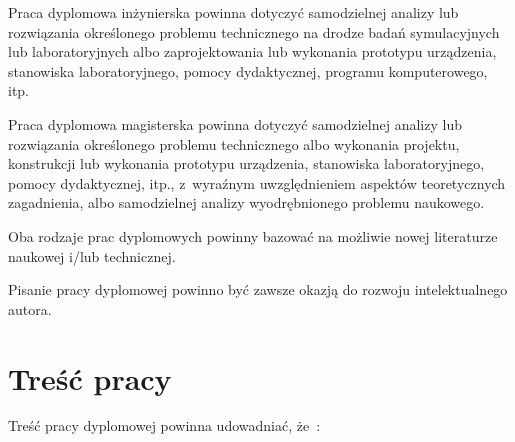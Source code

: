 \documentclass[skorowidz,skroty]{dyplomWEZUT}
\begin{document}
Praca dyplomowa inżynierska powinna dotyczyć samodzielnej analizy lub rozwiązania określonego problemu technicznego na drodze badań symulacyjnych lub laboratoryjnych albo zaprojektowania lub wykonania prototypu urządzenia, stanowiska laboratoryjnego, pomocy dydaktycznej, programu komputerowego, itp.

Praca dyplomowa magisterska powinna dotyczyć samodzielnej analizy lub rozwiązania określonego problemu technicznego albo wykonania projektu, konstrukcji lub wykonania prototypu urządzenia, stanowiska laboratoryjnego, pomocy dydaktycznej, itp., z~wyraźnym uwzględnieniem aspektów teoretycznych zagadnienia, albo samodzielnej analizy wyodrębnionego problemu naukowego.

Oba rodzaje prac dyplomowych powinny bazować na możliwie nowej literaturze naukowej i/lub technicznej.

Pisanie pracy dyplomowej powinno być zawsze okazją do rozwoju intelektualnego autora.

\section{Treść pracy}\label{sec:trescpracy}

Treść pracy dyplomowej powinna udowadniać, że~\cite{Zenderowski2004}:
\end{document}
